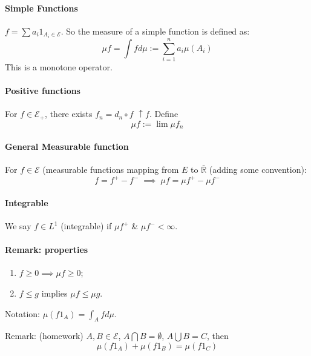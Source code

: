 \documentclass[11pt]{article}
\newcommand{\m}{\mathcal}
\newcommand{\R}{{\mathbb R}}
\begin{document}
        \paragraph{Simple Functions}
        $f =  \sum a_i 1_{A_i \in \m E}$. So the measure of a simple function is defined
        as: 
        \[
          \mu f = \int f d\mu := \sum_{i=1}^n a_i \mu(A_i)
        \]
        This is a monotone operator. 

        \paragraph{Positive functions} For $f \in \m E_+$, there exists $f_n = d_n \circ
        f$ $\uparrow f$. Define 
        \[
          \mu f := \lim \mu f_n
        \]

        \paragraph{General Measurable function}
        For $f \in \m E$ (measurable functions mapping from $E$ to $\bar \R$ (adding
        some convention): 
        \[
          f = f^+ - f^- \; \implies \; \mu f = \mu f^+ - \mu f^-
        \]
        \paragraph{Integrable}
        We say $f \in L^1 $ (integrable) if $\mu f^+ $ \& $\mu f^- < \infty$. 

        \paragraph{Remark: properties}
        \begin{enumerate}
          \item $f \ge 0 \implies \mu f \ge 0$;
          \item $f \le g$ implies $ \mu f \le \mu g$. 
        \end{enumerate}

        Notation: $\mu (f 1_A) = \int_A f d\mu$. 

        Remark: (homework) $A, B \in \m E$, $A\bigcap B = \emptyset$, $A \bigcup B = C$,
        then
        \[
          \mu (f 1_A)+ \mu (f 1_B)  = \mu (f 1_C)
        \]
\end{document}
